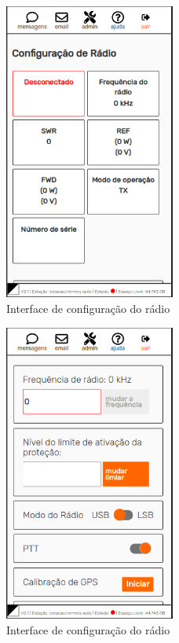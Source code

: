 \documentclass[11pt,a4paper]{article}
\begin{document}

\begin{figure}[H]
    \centering
    \includegraphics[width=0.5\textwidth]{screenshots/frontend/pt_kn/radioconfig.png}
    \caption{Interface de configuração do rádio}
	\vspace{-10pt}
    \label{fig:radioconf}
\end{figure}    

\begin{figure}[H]
    \centering
    \includegraphics[width=0.5\textwidth]{screenshots/frontend/pt_kn/radioconfig2.png}
    \caption{Interface de configuração do rádio}
	\vspace{-10pt}
    \label{fig:radioconf2}
\end{figure}   
\end{document}
